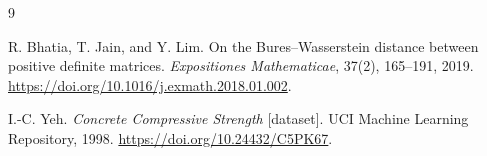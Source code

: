 \documentclass[11pt]{article}
\def\StudyMathEnd{\end{document}}
\begin{document}
\begin{thebibliography}{9}

R. Bhatia, T. Jain, and Y. Lim.
On the Bures--Wasserstein distance between positive definite matrices.
\emph{Expositiones Mathematicae}, 37(2), 165--191, 2019.
\url{https://doi.org/10.1016/j.exmath.2018.01.002}.

\ifdefined\StudyReport
{}
I.-C. Yeh.
\emph{Concrete Compressive Strength} [dataset].
UCI Machine Learning Repository, 1998.
\url{https://doi.org/10.24432/C5PK67}.
\fi

\end{thebibliography}

\StudyMathEnd
\end{document}
